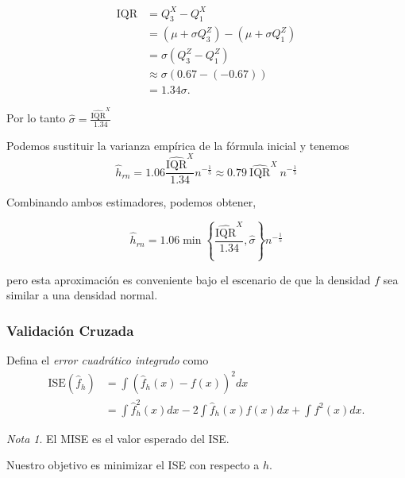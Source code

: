 \documentclass[
  12pt,
]{book}
\theoremstyle{definition}
\theoremstyle{definition}
\theoremstyle{definition}
\theoremstyle{definition}
\theoremstyle{remark}
\newtheorem*{remark}{Nota}
\begin{document}
\begin{align*}
\mathrm{IQR}
& = Q^{X}_{3} - Q^{X}_{1}                                                     \\
& = \left( \mu+\sigma Q^{Z}_{3} \right) - \left( \mu+\sigma Q^{Z}_{1} \right) \\
& = \sigma \left(Q^{Z}_{3} - Q^{Z}_{1} \right)                                \\
& \approx \sigma \left( 0.67 - (-0.67) \right)                                 \\
& =1.34 \sigma.
\end{align*}

Por lo tanto
\(\displaystyle \hat{\sigma} = \frac{\widehat{\mathrm{IQR}}^{X}}{1.34}\)

Podemos sustituir la varianza empírica de la fórmula inicial y tenemos
\begin{equation*}
\hat{h}_{rn} = 1.06 \frac{\widehat{\mathrm{IQR}}^{X}}{1.34} n^{-\frac{1}{5}} \approx 0.79\  \widehat{\mathrm{IQR}}^{X}\ n^{-\frac{1}{5}}
\end{equation*}

Combinando ambos estimadores, podemos obtener,

\begin{equation*}
\hat{h}_{rn} = 1.06 \min \left\{\frac{\widehat{\mathrm{IQR}}^{X}}{1.34}, \hat{\sigma }\right\} n^{-\frac{1}{5}}
\end{equation*}

pero esta aproximación es conveniente bajo el escenario de que la densidad \(f\) sea similar a una densidad normal.

\hypertarget{validaciuxf3n-cruzada}{%
\subsubsection{Validación Cruzada}\label{validaciuxf3n-cruzada}}

Defina el \emph{error cuadrático integrado} como \begin{align*}
\mathrm{ISE}(\hat{f}_{h}) & =\int\left(\hat{f}_{h}(x)-f(x)\right)^{2}dx\nonumber                   \\
& =\int \hat{f}_{h}^{2}(x)dx-2\int \hat{f}_{h}(x)f(x)dx+\int f^{2}(x)dx.
\end{align*}

\begin{remark}
El MISE es el valor esperado del ISE.
\end{remark}

Nuestro objetivo es minimizar el ISE con respecto a \(h\).
\end{document}
